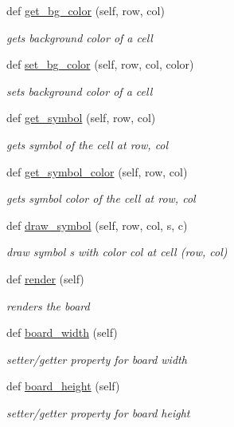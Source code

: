 \begin{DoxyCompactItemize}
def \mbox{\hyperlink{classbridges_1_1gamebase_1_1_game_base_a2e1fd4365bf805a85c19bef1eb197b22}{get\+\_\+bg\+\_\+color}} (self, row, col)
\begin{DoxyCompactList}\small\item\em gets background color of a cell \end{DoxyCompactList}\item 
def \mbox{\hyperlink{classbridges_1_1gamebase_1_1_game_base_a669740699d8d3a848172febbfbfa174f}{set\+\_\+bg\+\_\+color}} (self, row, col, color)
\begin{DoxyCompactList}\small\item\em sets background color of a cell \end{DoxyCompactList}\item 
def \mbox{\hyperlink{classbridges_1_1gamebase_1_1_game_base_a80a3f5e32f8d0ad45c3f72d3c3e134e3}{get\+\_\+symbol}} (self, row, col)
\begin{DoxyCompactList}\small\item\em gets symbol of the cell at row, col \end{DoxyCompactList}\item 
def \mbox{\hyperlink{classbridges_1_1gamebase_1_1_game_base_a7cb6637713536701e89e870a5a3428a1}{get\+\_\+symbol\+\_\+color}} (self, row, col)
\begin{DoxyCompactList}\small\item\em gets symbol color of the cell at row, col \end{DoxyCompactList}\item 
def \mbox{\hyperlink{classbridges_1_1gamebase_1_1_game_base_a6c9a7b7e5d84874f42a6150ec25d3791}{draw\+\_\+symbol}} (self, row, col, s, c)
\begin{DoxyCompactList}\small\item\em draw symbol s with color col at cell (row, col) \end{DoxyCompactList}\item 
def \mbox{\hyperlink{classbridges_1_1gamebase_1_1_game_base_a3ae3bcb9702097029509d4123bc9276e}{render}} (self)
\begin{DoxyCompactList}\small\item\em renders the board \end{DoxyCompactList}\item 
def \mbox{\hyperlink{classbridges_1_1gamebase_1_1_game_base_a46a635c075e1a0a651e4caa18369494d}{board\+\_\+width}} (self)
\begin{DoxyCompactList}\small\item\em setter/getter property for board width \end{DoxyCompactList}\item 
def \mbox{\hyperlink{classbridges_1_1gamebase_1_1_game_base_ad1595582d3b02aa4225efed3beab935f}{board\+\_\+height}} (self)
\begin{DoxyCompactList}\small\item\em setter/getter property for board height \end{DoxyCompactList}\end{DoxyCompactItemize}
